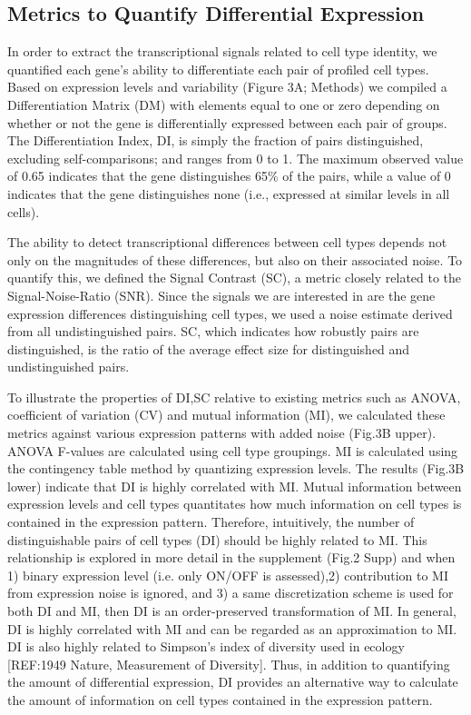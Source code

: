 \subsection{Metrics to Quantify Differential Expression}
In order to extract the transcriptional signals related to cell type identity, we quantified each gene's ability to differentiate each pair of profiled cell types. Based on expression levels and variability (Figure 3A; Methods) we compiled a Differentiation Matrix (DM) with elements equal to one or zero depending on whether or not the gene is differentially expressed between each pair of groups. The Differentiation Index, DI, is simply the fraction of pairs distinguished, excluding self-comparisons; and ranges from 0 to 1. The maximum observed value of 0.65 indicates that the gene distinguishes 65\% of the pairs, while a value of 0 indicates that the gene distinguishes none (i.e., expressed at similar levels in all cells). 

The ability to detect transcriptional differences between cell types depends not only on the magnitudes of these differences, but also on their associated noise. To quantify this, we defined the Signal Contrast (SC), a metric closely related to the Signal-Noise-Ratio (SNR). Since the signals we are interested in are the gene expression differences distinguishing cell types, we used a noise estimate derived from all undistinguished pairs. SC, which indicates how robustly pairs are distinguished, is the ratio of the average effect size for distinguished and undistinguished pairs. 

To illustrate the properties of DI,SC relative to existing metrics such as ANOVA, coefficient of variation (CV) and mutual information (MI), we calculated these metrics against various expression patterns with added noise (Fig.3B upper). ANOVA F-values are calculated using cell type groupings. MI is calculated using the contingency table method by quantizing expression levels. 
The results (Fig.3B lower) indicate that DI is highly correlated with MI. Mutual information between expression levels and cell types quantitates how much information on cell types is contained in the expression pattern. Therefore, intuitively, the number of distinguishable pairs of cell types (DI) should be highly related to MI. This relationship is explored in more detail in the supplement (Fig.2 Supp) and when 1) binary expression level (i.e. only ON/OFF is assessed),2) contribution to MI from expression noise is ignored, and 3) a same discretization scheme is used for both DI and MI, then DI is an order-preserved transformation of MI. In general, DI is highly correlated with MI and can be regarded as an approximation to MI. DI is also highly related to Simpson's index of diversity used in ecology [REF:1949 Nature, Measurement of Diversity]. Thus, in addition to quantifying the amount of differential expression, DI provides an alternative way to calculate the amount of information on cell types contained in the expression pattern. 


